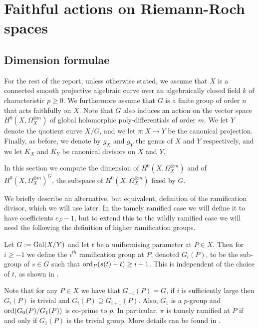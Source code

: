 \chapter{Faithful actions on Riemann-Roch spaces} \label{Chapter:Faithfulactions}
\section{Dimension formulae}\label{dimsection}



For the rest of the report, unless otherwise stated, we assume that $X$ is a connected smooth projective algebraic curve over an algebraically closed field $k$ of characteristic $p \geq 0$.
We furthermore assume that $G$ is a finite group of order $n$ that acts faithfully on $X$.
Note that $G$ also induces an action on the vector space $H^0(X,\Omega_X^{\otimes m})$ of global holomorphic poly-differentials of order $m$.
We let $Y$ denote the quotient curve $X/G$, and we let $\pi:X\rightarrow Y$ be the canonical projection.
Finally, as before, we denote by $g_X$ and $g_Y$ the genus of $X$ and $Y$ respectively, and we let $K_X$ and $K_Y$ be canonical divisors on $X$ and $Y$.


In this section we compute the dimension of $H^0(X,\Omega_X^{\otimes m})$ and of $H^0(X,\Omega_X^{\otimes m})^G$, the subspace of $H^0(X,\Omega_X^{\otimes m})$ fixed by $G$.


We briefly describe an alternative, but equivalent, definition of the ramification divisor, which we will use later.
In the tamely ramified case we will define it to have coefficients $e_P-1$, but to extend this to the wildly ramified case we will need the following the definition of higher ramification groups.


    \begin{defn}
    Let $G:=\operatorname{Gal}(X/Y)$ and let $t$ be a uniformising parameter at $P\in X$.
    Then for $i\geq -1$ we define the $i^{th}$ ramification group at $P$, denoted $G_i(P)$, to be the sub-group of $s\in G$ such that $\operatorname{ord}_P(s(t)-t)\geq i+1$.
    This is	independent of the choice of $t$, as shown in \cite[Chap. IV, \S 1, pg. 62]{localfields}.
    \end{defn}

Note that for any $P\in X$ we have that $G_{-1}(P)=G$, if $i$ is sufficiently large then $G_i(P)$ is trivial and $G_i(P)\supseteq G_{i+1}(P)$.
Also, $G_1$ is a $p$-group and $\operatorname{ord}(G_0(P)/G_1(P))$ is co-prime to $p$.
In particular, $\pi$ is tamely ramified at $P$ if and only if $G_1(P)$ is the trivial group.
More details can be found in \cite[Chap. IV, \S 1]{localfields}.%


